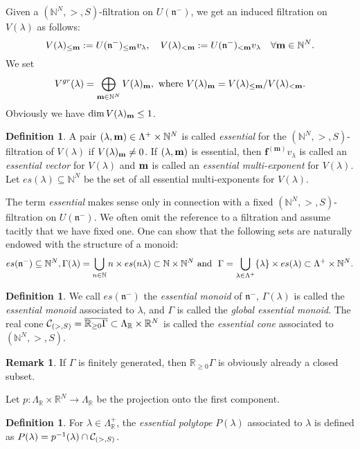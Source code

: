 \documentclass{emsprocart}
\theoremstyle{definition}
\newtheorem{definition}[theorem]{Definition}
\newtheorem{remark}[theorem]{Remark}
\begin{document}
Given a $(\mathbb N^N,>,S)$-filtration on $U(\mathfrak n^-)$,
we get an induced filtration on $V(\lambda)$ as follows:
$$
V(\lambda)_{\bf \le m}:=U(\mathfrak n^-)_{\bf \le m}  v_\lambda, \quad V(\lambda)_{\bf < m}:=U(\mathfrak n^-)_{\bf <m}  v_\lambda\quad \forall \mathbf{m}\in \mathbb N^N.
$$
We set
$$
V^{gr}(\lambda)=\bigoplus_{{\bf m}\in \mathbb N^N} V(\lambda)_{\bf m},\hbox{\  where\ }V(\lambda)_{\bf m}= V(\lambda)_{\bf \le m}/V(\lambda)_{\bf <m}.
$$
Obviously we have  $\dim V(\lambda)_{\bf m}\le 1$.
\begin{definition}
A pair  $(\lambda,{\bf m})\in \Lambda^+\times \mathbb N^N$ is called {\it essential} for the $(\mathbb N^N,>,S)$-filtration of $V(\lambda)$ if $V(\lambda)_{\bf m}\not=0$.
If $(\lambda,\bf m)$ is essential, then $\mathbf f^{(\mathbf m)}v_\lambda$ is called an {\it essential vector} for $V(\lambda)$ and
$\bf m$ is called an {\it essential multi-exponent} for $V(\lambda)$.
Let  $es(\lambda)\subseteq \mathbb N^N$ be the set of all essential multi-exponents for $V(\lambda)$.
\end{definition}
The term {\it essential} makes sense only in connection with a fixed $(\mathbb N^N,>,S)$-filtration on $U(\mathfrak n^-)$.
We often omit the reference to a filtration and assume tacitly that we have fixed one. One can show that the following sets are naturally endowed with the structure of a monoid:
$$
es(\mathfrak n^-)\subseteq \mathbb N^N, \Gamma(\lambda)=\bigcup_{n\in\mathbb N} n\times es(n\lambda)\subset \mathbb N\times \mathbb N^N\ \hbox{and\ }\
\Gamma=\bigcup_{\lambda\in\Lambda^+} \{\lambda\}\times es(\lambda) \subset \Lambda^+\times \mathbb N^N.
$$
\begin{definition}
We call $es(\mathfrak n^-)$ the {\it essential monoid} of $\mathfrak n^-$,
$\Gamma(\lambda)$  is called the {\it essential monoid} associated to $\lambda$, and $\Gamma$
is called the {\it global essential monoid}. The real cone ${\cal C}_{(>,S)}=\overline{\mathbb R_{\ge 0} \Gamma} \subset \Lambda_{\mathbb R}\times \mathbb R^N$
is called the {\it essential cone} associated to $(\mathbb N^N,>,S)$.
\end{definition}
\begin{remark} If $\Gamma$ is finitely generated, then $\mathbb R_{\ge 0} \Gamma$ is obviously already a closed subset.
\end{remark}

Let $p:\Lambda_{\mathbb R}\times \mathbb R^N\rightarrow \Lambda_{\mathbb R}$ be the projection onto the first component.
\begin{definition}
For $\lambda\in \Lambda^+_{\mathbb R}$, the {\it essential polytope} $P(\lambda)$ associated to $\lambda$ is defined as
$P(\lambda)=p^{-1}(\lambda)\cap {\cal C}_{(>,S)}$.
\end{definition}
\end{document}
